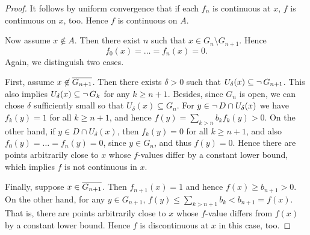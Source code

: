 \begin{proof}
It follows by uniform convergence that if each $f_n$ is continuous at $x$, $f$ is continuous on $x$, too. Hence $f$ is continuous on $A$.

Now assume $x \not\in A$. Then there exist $n$ such that $x \in G_n \setminus G_{n+1}$. Hence
\begin{equation*}
f_0(x) = \dots = f_n(x) = 0.
\end{equation*}
Again, we distinguish two cases.

First, assume $x \not\in \overline{G_{n+1}}$. Then there exists $\delta > 0$ such that $U_\delta(x) \subseteq \neg \, G_{n+1}$. This also implies  $U_\delta(x) \subseteq \neg \, G_{k}$ for any $k \geq n+1$. Besides, since $G_n$ is open, we can chose $\delta$ sufficiently small so that $U_\delta(x) \subseteq G_n$. For $y \in \neg \, D \cap U_\delta(x)$ we have $f_k(y) = 1$ for all $k \geq n+1$, and hence $f(y) = \sum_{k > n} b_k f_k(y) > 0$. On the other hand, if $y \in D \cap U_\delta(x)$, then $f_k(y) = 0$ for all $k \geq n+1$, and also $f_0(y) = \dots = f_n(y) = 0$, since $y \in G_n$, and thus $f(y) = 0$. Hence there are points arbitrarily close to $x$ whose $f$-values differ by a constant lower bound, which implies $f$ is not continuous in $x$.

Finally, suppose $x \in \overline{G_{n+1}}$. Then $f_{n+1}(x) = 1$ and hence $f(x) \geq b_{n+1} > 0$. On the other hand, for any $y \in G_{n+1}$, $f(y) \leq \sum_{k> n+1} b_k < b_{n+1} = f(x)$. That is, there are points arbitrarily close to $x$ whose $f$-value differs from $f(x)$ by a constant lower bound. Hence $f$ is discontinuous at $x$ in this case, too.

\end{proof}